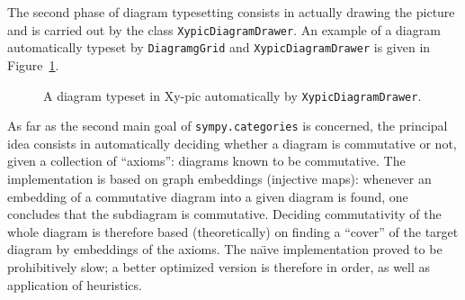 The second phase of diagram typesetting consists in actually drawing the picture
and is carried out by the class \texttt{XypicDiagramDrawer}.  An example of a
diagram automatically typeset by \texttt{DiagramgGrid} and
\texttt{XypicDiagramDrawer} is given in Figure~\ref{fig:cat:loops}.
\begin{figure}[h]
  \centerline{
  }
  \caption{A diagram typeset in Xy-pic automatically by \texttt{XypicDiagramDrawer}.}\label{fig:cat:loops}
\end{figure}

As far as the second main goal of \texttt{sympy.categories} is concerned, the principal idea
consists in automatically deciding whether a diagram is commutative or not,
given a collection of ``axioms'': diagrams known to be commutative. The
implementation is based on graph embeddings (injective maps): whenever an
embedding of a commutative diagram into a given diagram is found, one
concludes that the subdiagram is commutative. Deciding commutativity of the
whole diagram is therefore based (theoretically) on finding a ``cover'' of the
target diagram by embeddings of the axioms. The na\"{\i}ve implementation
proved to be prohibitively slow; a better optimized version is therefore in
order, as well as application of heuristics.

